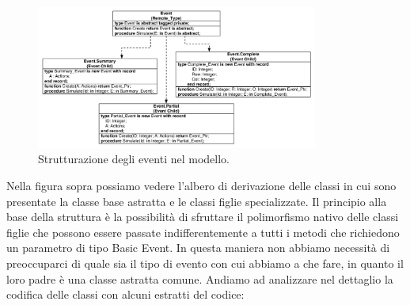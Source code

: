 \documentclass[aps,letterpaper,10pt]{article}
\begin{document}
\begin{figure}[H]
	\begin{center}
		\includegraphics[width=350px]{images/event-struct.pdf}
	\end{center}
\caption{Strutturazione degli eventi nel modello.}
\end{figure}

Nella figura sopra possiamo vedere l'albero di derivazione delle classi in cui sono presentate la classe base astratta e le classi figlie specializzate. Il principio alla base della struttura \`e la possibilit\`a di sfruttare il polimorfismo nativo delle classi figlie che possono essere passate indifferentemente a tutti i metodi che richiedono un parametro di tipo Basic Event. In questa maniera non abbiamo necessit\`a di preoccuparci di quale sia il tipo di evento con cui abbiamo a che fare, in quanto il loro padre \`e una classe astratta comune. Andiamo ad analizzare nel dettaglio la codifica delle classi con alcuni estratti del codice:
\end{document}

